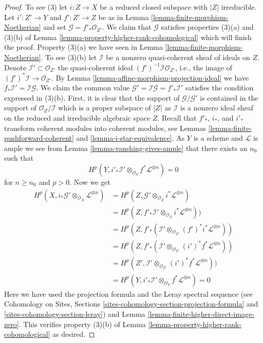 \documentclass{stacks-project}
\theoremstyle{plain}
\theoremstyle{definition}
\theoremstyle{remark}
\numberwithin{equation}{subsection}
\begin{document}
\begin{proof}
\medskip\noindent
To see (3) let $i : Z \to X$ be a reduced closed subspace with $|Z|$
irreducible. Let $i' : Z' \to Y$ and $f' : Z' \to Z$ be as in
Lemma \ref{lemma-finite-morphism-Noetherian} and set
$\mathcal{G} = f'_*\mathcal{O}_{Z'}$. We claim that
$\mathcal{G}$ satisfies properties (3)(a) and (3)(b) of
Lemma \ref{lemma-property-higher-rank-cohomological}
which will finish the proof. Property (3)(a) we have seen in
Lemma \ref{lemma-finite-morphism-Noetherian}. To see (3)(b) let
$\mathcal{I}$ be a nonzero quasi-coherent sheaf of ideals on $Z$.
Denote $\mathcal{I}' \subset \mathcal{O}_{Z'}$ the quasi-coherent
ideal $(f')^{-1}\mathcal{I} \mathcal{O}_{Z'}$, i.e., the
image of $(f')^*\mathcal{I} \to \mathcal{O}_{Z'}$.
By Lemma \ref{lemma-affine-morphism-projection-ideal} we have
$f_*\mathcal{I}' = \mathcal{I} \mathcal{G}$. We claim the common value
$\mathcal{G}' = \mathcal{I} \mathcal{G} = f'_*\mathcal{I}'$
satisfies the condition expressed in (3)(b).
First, it is clear that the support of $\mathcal{G}/\mathcal{G}'$
is contained in the support of $\mathcal{O}_Z/\mathcal{I}$
which is a proper subspace of $|Z|$ as $\mathcal{I}$ is a
nonzero ideal sheaf on the reduced and irreducible algebraic space $Z$.
Recall that $f'_*$, $i_*$, and $i'_*$ transform coherent modules into
coherent modules, see Lemmas \ref{lemma-finite-pushforward-coherent} and
\ref{lemma-i-star-equivalence}.
As $Y$ is a scheme and $\mathcal{L}$ is ample
we see from Lemma \ref{lemma-vanshing-gives-ample}
that there exists an $n_0$ such that
$$
H^p(Y, i'_*\mathcal{I}' \otimes_{\mathcal{O}_Y} f^*\mathcal{L}^{\otimes n}) = 0
$$
for $n \geq n_0$ and $p > 0$. Now we get
\begin{align*}
H^p(X, i_*\mathcal{G}' \otimes_{\mathcal{O}_X} \mathcal{L}^{\otimes n})
& =
H^p(Z, \mathcal{G'} \otimes_{\mathcal{O}_Z} i^*\mathcal{L}^{\otimes n}) \\
& =
H^p(Z,
f'_*\mathcal{I}' \otimes_{\mathcal{O}_Z} i^*\mathcal{L}^{\otimes n})) \\
& =
H^p(Z, f'_*(\mathcal{I}' \otimes_{\mathcal{O}_{Z'}}
(f')^*i^*\mathcal{L}^{\otimes n})) \\
& =
H^p(Z, f'_*(\mathcal{I}' \otimes_{\mathcal{O}_{Z'}}
(i')^*f^*\mathcal{L}^{\otimes n})) \\
& =
H^p(Z',
\mathcal{I}' \otimes_{\mathcal{O}_{Z'}} (i')^*f^*\mathcal{L}^{\otimes n})) \\
& =
H^p(Y, i'_*\mathcal{I}' \otimes_{\mathcal{O}_Y} f^*\mathcal{L}^{\otimes n}) = 0
\end{align*}
Here we have used the projection formula and the Leray spectral sequence
(see Cohomology on Sites, Sections
\ref{sites-cohomology-section-projection-formula} and
\ref{sites-cohomology-section-leray})
and Lemma \ref{lemma-finite-higher-direct-image-zero}.
This verifies property (3)(b) of
Lemma \ref{lemma-property-higher-rank-cohomological} as desired.
\end{proof}
\end{document}
